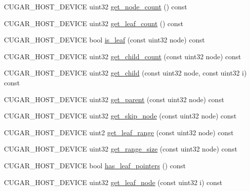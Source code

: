 \begin{DoxyCompactItemize}
\item 
C\+U\+G\+A\+R\+\_\+\+H\+O\+S\+T\+\_\+\+D\+E\+V\+I\+CE uint32 \hyperlink{structcugar_1_1_bintree__visitor_3_01_node__type_00_01leaf__range__tag_01_4_a50bb8a7e19e17bfd131f9af1c4f51495}{get\+\_\+node\+\_\+count} () const
\item 
C\+U\+G\+A\+R\+\_\+\+H\+O\+S\+T\+\_\+\+D\+E\+V\+I\+CE uint32 \hyperlink{structcugar_1_1_bintree__visitor_3_01_node__type_00_01leaf__range__tag_01_4_a53716e92f547bb07e28c41731caec257}{get\+\_\+leaf\+\_\+count} () const
\item 
C\+U\+G\+A\+R\+\_\+\+H\+O\+S\+T\+\_\+\+D\+E\+V\+I\+CE bool \hyperlink{structcugar_1_1_bintree__visitor_3_01_node__type_00_01leaf__range__tag_01_4_a2fa5471dc2614fcd424d213a19815194}{is\+\_\+leaf} (const uint32 node) const
\item 
C\+U\+G\+A\+R\+\_\+\+H\+O\+S\+T\+\_\+\+D\+E\+V\+I\+CE uint32 \hyperlink{structcugar_1_1_bintree__visitor_3_01_node__type_00_01leaf__range__tag_01_4_ad70af0b136875f337e5a8df8ac38ff02}{get\+\_\+child\+\_\+count} (const uint32 node) const
\item 
C\+U\+G\+A\+R\+\_\+\+H\+O\+S\+T\+\_\+\+D\+E\+V\+I\+CE uint32 \hyperlink{structcugar_1_1_bintree__visitor_3_01_node__type_00_01leaf__range__tag_01_4_af6aee10fb70ea0776d23fb677e01796b}{get\+\_\+child} (const uint32 node, const uint32 i) const
\item 
C\+U\+G\+A\+R\+\_\+\+H\+O\+S\+T\+\_\+\+D\+E\+V\+I\+CE uint32 \hyperlink{structcugar_1_1_bintree__visitor_3_01_node__type_00_01leaf__range__tag_01_4_a187dfd74db1f7cae27bc37e40dbd75d8}{get\+\_\+parent} (const uint32 node) const
\item 
C\+U\+G\+A\+R\+\_\+\+H\+O\+S\+T\+\_\+\+D\+E\+V\+I\+CE uint32 \hyperlink{structcugar_1_1_bintree__visitor_3_01_node__type_00_01leaf__range__tag_01_4_a70b5db6f62a3b8e709679d353e3d0482}{get\+\_\+skip\+\_\+node} (const uint32 node) const
\item 
C\+U\+G\+A\+R\+\_\+\+H\+O\+S\+T\+\_\+\+D\+E\+V\+I\+CE uint2 \hyperlink{structcugar_1_1_bintree__visitor_3_01_node__type_00_01leaf__range__tag_01_4_a45d4c8993bc6e0e4af1fe6b4734b3931}{get\+\_\+leaf\+\_\+range} (const uint32 node) const
\item 
C\+U\+G\+A\+R\+\_\+\+H\+O\+S\+T\+\_\+\+D\+E\+V\+I\+CE uint32 \hyperlink{structcugar_1_1_bintree__visitor_3_01_node__type_00_01leaf__range__tag_01_4_a168d80fc45b97d3e6983a59d0d959300}{get\+\_\+range\+\_\+size} (const uint32 node) const
\item 
C\+U\+G\+A\+R\+\_\+\+H\+O\+S\+T\+\_\+\+D\+E\+V\+I\+CE bool \hyperlink{structcugar_1_1_bintree__visitor_3_01_node__type_00_01leaf__range__tag_01_4_a4e358969761786d0076bf8372d4f0b9e}{has\+\_\+leaf\+\_\+pointers} () const
\item 
C\+U\+G\+A\+R\+\_\+\+H\+O\+S\+T\+\_\+\+D\+E\+V\+I\+CE uint32 \hyperlink{structcugar_1_1_bintree__visitor_3_01_node__type_00_01leaf__range__tag_01_4_a1db1b8811bbcb81ad82a35d258b0f1a0}{get\+\_\+leaf\+\_\+node} (const uint32 i) const
\end{DoxyCompactItemize}
